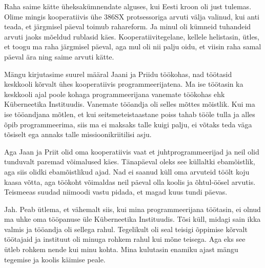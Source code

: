 Raha saime kätte üheksakümnendate alguses, kui Eesti 
kroon oli just tulemas. Olime mingis kooperatiivis ühe
386SX protsessoriga arvuti välja valinud, kui anti teada, et järgmisel 
päeval toimub rahareform. Ja minul oli kümneid tuhandeid arvuti jaoks mõeldud 
rublasid käes. Kooperatiivitegelane, kellele helistasin, ütles, et toogu 
ma raha järgmisel päeval, aga mul oli nii palju oidu, et viisin raha samal 
päeval ära ning saime arvuti kätte. 


Mängu kirjutasime suurel määral Jaani 
ja Priidu töökohas, nad töötasid keskkooli 
kõrvalt ühes kooperatiivis programmeerijatena. Ma ise töötasin ka 
keskkooli ajal poole kohaga programmeerijana vanemate töökohas 
ehk Küberneetika Instituudis. Vanemate tööandja 
oli selles mõttes mõistlik. 
Kui ma ise tööandjana mõtlen, et kui seitsmeteistaastane poiss 
tahab tööle tulla ja alles õpib programmeerima, siis ma 
ei maksaks talle kuigi palju, ei võtaks teda väga tõsiselt ega  
annaks talle missioonikriitilisi asju. 

Aga Jaan ja Priit olid oma kooperatiivis vaat et juhtprogrammeerijad ja neil 
olid 
tunduvalt paremad võimalused käes. Tänapäeval oleks see
küllaltki ebamõistlik, aga siis olidki ebamõistlikud ajad. 
Nad ei saanud küll oma arvuteid töölt koju kaasa võtta, aga töökoht võimaldas 
neil
päeval olla koolis ja õhtul-öösel 
arvutis. Teismeeas suudad niimoodi vastu 
pidada, et magad kuus tundi päevas.


Jah. Peab ütlema, et vähemalt siis, kui mina programmeerijana töötasin, ei 
olnud ma
uhke oma tööpanuse üle Küberneetika Instituudis. 
Tõsi küll, midagi sain ikka valmis 
ja tööandja oli sellega rahul. Tegelikult oli seal
teisigi õppimise kõrvalt töötajaid ja instituut oli minuga rohkem rahul kui 
mõne teisega. Aga eks see ütleb rohkem nende kui 
minu kohta. Mina kulutasin enamiku ajast mängu tegemise ja koolis käimise 
peale.


